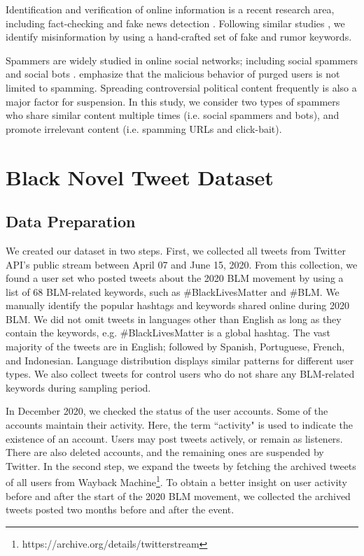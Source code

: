 \documentclass[sigconf]{acmart}
\begin{document}
Identification and verification of online information is a recent research area, including fact-checking \cite{Parekh:2020} and fake news detection \cite{Giachanou:2020}. Following similar studies \cite{Chowdhury:2021}, we identify misinformation by using a hand-crafted set of fake and rumor keywords.

Spammers are widely studied in online social networks; including social spammers \cite{Lee:2010} and social bots \cite{Ferrara:2016}. \citet{Chowdhury:2020} emphasize that the malicious behavior of purged users is not limited to spamming. Spreading controversial political content frequently is also a major factor for suspension. In this study, we consider two types of spammers who share similar content multiple times (i.e. social spammers and bots), and promote irrelevant content (i.e. spamming URLs and click-bait).


\section{B\texorpdfstring{\MakeLowercase{lack}}\texorpdfstring{L}\texorpdfstring{\MakeLowercase{ives}}\texorpdfstring{M}\texorpdfstring{\MakeLowercase{atter2020}}\texorpdfstring{:} A Novel Tweet Dataset}\label{section:dataset}

\subsection{Data Preparation}

We created our dataset in two steps. First, we collected all tweets from Twitter API's public stream between April 07 and June 15, 2020. From this collection, we found a user set who posted tweets about the 2020 BLM movement by using a list of 68 BLM-related keywords, such as \#BlackLivesMatter and \#BLM. We manually identify the popular hashtags and keywords shared online during 2020 BLM. We did not omit tweets in languages other than English as long as they contain the keywords, e.g. \#BlackLivesMatter is a global hashtag. The vast majority of the tweets are in English; followed by Spanish, Portuguese, French, and Indonesian. Language distribution displays similar patterns for different user types. We also collect tweets for control users who do not share any BLM-related keywords during sampling period.

In December 2020, we checked the status of the user accounts. Some of the accounts maintain their activity. Here, the term ``activity" is used to indicate the existence of an account. Users may post tweets actively, or remain as listeners. There are also deleted accounts, and the remaining ones are suspended by Twitter. In the second step, we expand the tweets by fetching the archived tweets of all users from Wayback Machine\footnote{https://archive.org/details/twitterstream}. To obtain a better insight on user activity before and after the start of the 2020 BLM movement, we collected the archived tweets posted two months before and after the event.
\end{document}
